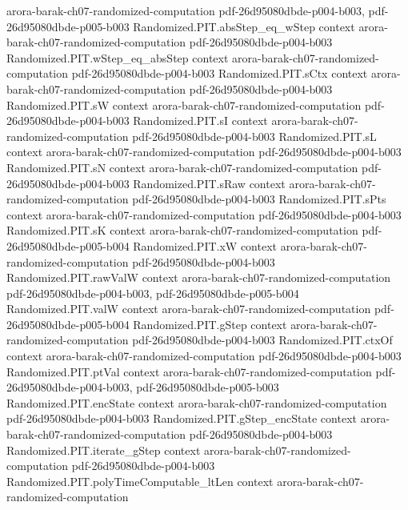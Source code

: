 \begin{theorem}
  {arora-barak-ch07-randomized-computation}
  {pdf-26d95080dbde-p004-b003,
    pdf-26d95080dbde-p005-b003}
\proofstep
  {Randomized.PIT.absStep_eq_wStep}
  {context}
  {arora-barak-ch07-randomized-computation}
  {pdf-26d95080dbde-p004-b003}
\proofstep
  {Randomized.PIT.wStep_eq_absStep}
  {context}
  {arora-barak-ch07-randomized-computation}
  {pdf-26d95080dbde-p004-b003}
\proofstep
  {Randomized.PIT.sCtx}
  {context}
  {arora-barak-ch07-randomized-computation}
  {pdf-26d95080dbde-p004-b003}
\proofstep
  {Randomized.PIT.sW}
  {context}
  {arora-barak-ch07-randomized-computation}
  {pdf-26d95080dbde-p004-b003}
\proofstep
  {Randomized.PIT.sI}
  {context}
  {arora-barak-ch07-randomized-computation}
  {pdf-26d95080dbde-p004-b003}
\proofstep
  {Randomized.PIT.sL}
  {context}
  {arora-barak-ch07-randomized-computation}
  {pdf-26d95080dbde-p004-b003}
\proofstep
  {Randomized.PIT.sN}
  {context}
  {arora-barak-ch07-randomized-computation}
  {pdf-26d95080dbde-p004-b003}
\proofstep
  {Randomized.PIT.sRaw}
  {context}
  {arora-barak-ch07-randomized-computation}
  {pdf-26d95080dbde-p004-b003}
\proofstep
  {Randomized.PIT.sPts}
  {context}
  {arora-barak-ch07-randomized-computation}
  {pdf-26d95080dbde-p004-b003}
\proofstep
  {Randomized.PIT.sK}
  {context}
  {arora-barak-ch07-randomized-computation}
  {pdf-26d95080dbde-p005-b004}
\proofstep
  {Randomized.PIT.xW}
  {context}
  {arora-barak-ch07-randomized-computation}
  {pdf-26d95080dbde-p004-b003}
\proofstep
  {Randomized.PIT.rawValW}
  {context}
  {arora-barak-ch07-randomized-computation}
  {pdf-26d95080dbde-p004-b003,
    pdf-26d95080dbde-p005-b004}
\proofstep
  {Randomized.PIT.valW}
  {context}
  {arora-barak-ch07-randomized-computation}
  {pdf-26d95080dbde-p005-b004}
\proofstep
  {Randomized.PIT.gStep}
  {context}
  {arora-barak-ch07-randomized-computation}
  {pdf-26d95080dbde-p004-b003}
\proofstep
  {Randomized.PIT.ctxOf}
  {context}
  {arora-barak-ch07-randomized-computation}
  {pdf-26d95080dbde-p004-b003}
\proofstep
  {Randomized.PIT.ptVal}
  {context}
  {arora-barak-ch07-randomized-computation}
  {pdf-26d95080dbde-p004-b003,
    pdf-26d95080dbde-p005-b003}
\proofstep
  {Randomized.PIT.encState}
  {context}
  {arora-barak-ch07-randomized-computation}
  {pdf-26d95080dbde-p004-b003}
\proofstep
  {Randomized.PIT.gStep_encState}
  {context}
  {arora-barak-ch07-randomized-computation}
  {pdf-26d95080dbde-p004-b003}
\proofstep
  {Randomized.PIT.iterate_gStep}
  {context}
  {arora-barak-ch07-randomized-computation}
  {pdf-26d95080dbde-p004-b003}
\proofstep
  {Randomized.PIT.polyTimeComputable_ltLen}
  {context}
  {arora-barak-ch07-randomized-computation}

\end{theorem}
